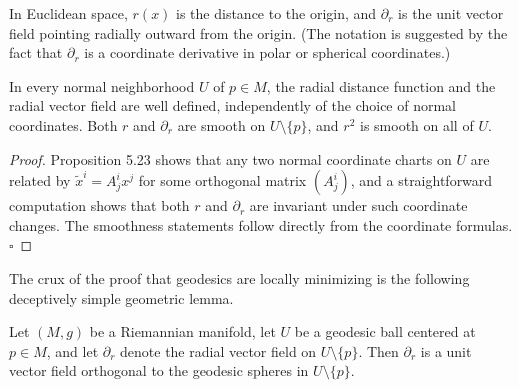 In Euclidean space, $r(x)$ is the distance to the origin, and $\partial_r$ is the unit vector field pointing radially outward from the origin. (The notation is suggested by the fact that $\partial_r$ is a coordinate derivative in polar or spherical coordinates.)

\begin{lemma}
\label{lem:radial-distance-well-defined}

In every normal neighborhood $U$ of $p \in M$, the radial distance function and the radial vector field are well defined, independently of the choice of normal coordinates. Both $r$ and $\partial_r$ are smooth on $U \setminus \{p\}$, and $r^2$ is smooth on all of $U$.
\end{lemma}

\begin{proof}
Proposition 5.23 shows that any two normal coordinate charts on $U$ are related by $\tilde{x}^i = A^i_j x^j$ for some orthogonal matrix $(A^i_j)$, and a straightforward computation shows that both $r$ and $\partial_r$ are invariant under such coordinate changes. The smoothness statements follow directly from the coordinate formulas. $\square$
\end{proof}

The crux of the proof that geodesics are locally minimizing is the following deceptively simple geometric lemma.

\begin{theorem}
\label{thm:gauss-lemma}

Let $(M, g)$ be a Riemannian manifold, let $U$ be a geodesic ball centered at $p \in M$, and let $\partial_r$ denote the radial vector field on $U \setminus \{p\}$. Then $\partial_r$ is a unit vector field orthogonal to the geodesic spheres in $U \setminus \{p\}$.
\end{theorem}

